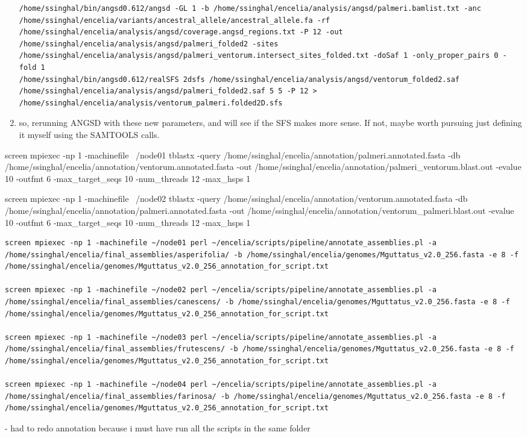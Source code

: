 \documentclass[idxtotoc,hyperref,openany,oneside]{labbook} %
\begin{document}
\begin{enumerate}
\begin{verbatim}
/home/ssinghal/bin/angsd0.612/angsd -GL 1 -b /home/ssinghal/encelia/analysis/angsd/palmeri.bamlist.txt -anc /home/ssinghal/encelia/variants/ancestral_allele/ancestral_allele.fa -rf /home/ssinghal/encelia/analysis/angsd/coverage.angsd_regions.txt -P 12 -out /home/ssinghal/encelia/analysis/angsd/palmeri_folded2 -sites /home/ssinghal/encelia/analysis/angsd/palmeri_ventorum.intersect_sites_folded.txt -doSaf 1 -only_proper_pairs 0 -fold 1
/home/ssinghal/bin/angsd0.612/realSFS 2dsfs /home/ssinghal/encelia/analysis/angsd/ventorum_folded2.saf /home/ssinghal/encelia/analysis/angsd/palmeri_folded2.saf 5 5 -P 12 > /home/ssinghal/encelia/analysis/ventorum_palmeri.folded2D.sfs
\end{verbatim}
\item so, rerunning ANGSD with these new parameters, and will see if the SFS makes more sense. If not, maybe worth pursuing just defining it myself using the SAMTOOLS calls.
\end{enumerate}

screen mpiexec -np 1 -machinefile ~/node01 tblastx -query /home/ssinghal/encelia/annotation/palmeri.annotated.fasta -db /home/ssinghal/encelia/annotation/ventorum.annotated.fasta -out /home/ssinghal/encelia/annotation/palmeri_ventorum.blast.out -evalue 10 -outfmt 6 -max_target_seqs 10 -num_threads 12 -max_hsps 1

screen mpiexec -np 1 -machinefile ~/node02 tblastx -query /home/ssinghal/encelia/annotation/ventorum.annotated.fasta -db /home/ssinghal/encelia/annotation/palmeri.annotated.fasta -out /home/ssinghal/encelia/annotation/ventorum_palmeri.blast.out -evalue 10 -outfmt 6 -max_target_seqs 10 -num_threads 12 -max_hsps 1

\begin{verbatim}
screen mpiexec -np 1 -machinefile ~/node01 perl ~/encelia/scripts/pipeline/annotate_assemblies.pl -a /home/ssinghal/encelia/final_assemblies/asperifolia/ -b /home/ssinghal/encelia/genomes/Mguttatus_v2.0_256.fasta -e 8 -f /home/ssinghal/encelia/genomes/Mguttatus_v2.0_256_annotation_for_script.txt

screen mpiexec -np 1 -machinefile ~/node02 perl ~/encelia/scripts/pipeline/annotate_assemblies.pl -a /home/ssinghal/encelia/final_assemblies/canescens/ -b /home/ssinghal/encelia/genomes/Mguttatus_v2.0_256.fasta -e 8 -f /home/ssinghal/encelia/genomes/Mguttatus_v2.0_256_annotation_for_script.txt

screen mpiexec -np 1 -machinefile ~/node03 perl ~/encelia/scripts/pipeline/annotate_assemblies.pl -a /home/ssinghal/encelia/final_assemblies/frutescens/ -b /home/ssinghal/encelia/genomes/Mguttatus_v2.0_256.fasta -e 8 -f /home/ssinghal/encelia/genomes/Mguttatus_v2.0_256_annotation_for_script.txt

screen mpiexec -np 1 -machinefile ~/node04 perl ~/encelia/scripts/pipeline/annotate_assemblies.pl -a /home/ssinghal/encelia/final_assemblies/farinosa/ -b /home/ssinghal/encelia/genomes/Mguttatus_v2.0_256.fasta -e 8 -f /home/ssinghal/encelia/genomes/Mguttatus_v2.0_256_annotation_for_script.txt
\end{verbatim}
- had to redo annotation because i must have run all the scripts in the same folder
\end{document}
